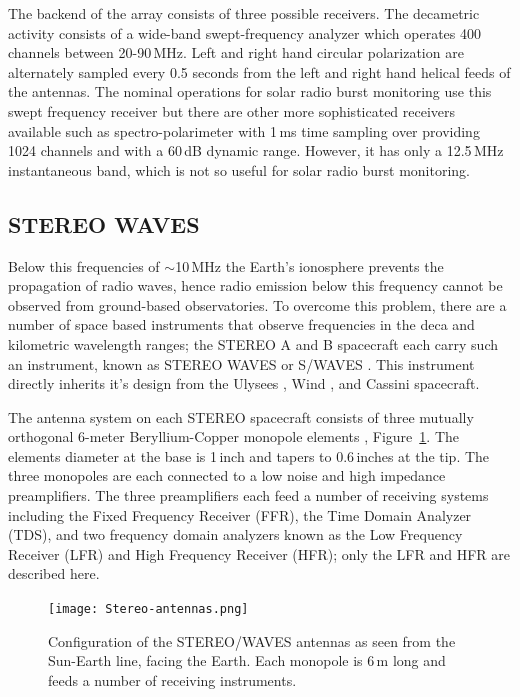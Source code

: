 The backend of the array consists of three possible receivers. The decametric activity consists of a wide-band swept-frequency analyzer which operates 400 channels between 20-90\,MHz. Left and right hand circular polarization are alternately sampled every 0.5 seconds from the left and right hand helical feeds of the antennas. The nominal operations for solar radio burst monitoring use this swept frequency receiver but there are other more sophisticated receivers available such as spectro-polarimeter with 1\,ms time sampling over providing 1024 channels and with a 60\,dB dynamic range. However, it has only a 12.5\,MHz instantaneous band, which is not so useful for solar radio burst monitoring.

\subsection{STEREO WAVES}\label{sec:31}

Below this frequencies of $\sim$10\,MHz the Earth's ionosphere prevents the propagation of radio waves, hence radio emission below this frequency cannot be observed from ground-based observatories. To overcome this problem, there are a number of space based instruments that observe frequencies in the deca and kilometric wavelength ranges; the STEREO A and B spacecraft each carry such an instrument, known as STEREO WAVES or S/WAVES \citep{bougeret2008}. This instrument directly inherits it's design from the Ulysees \citep{stone1992}, Wind \citep{bougeret1995}, and Cassini \citep{gurnett2004} spacecraft.

The antenna system on each STEREO spacecraft consists of three mutually orthogonal 6-meter Beryllium-Copper monopole elements \citep{bale2008}, Figure~\ref{fig:swaves_antennas}. The elements diameter at the base is 1\,inch and tapers to 0.6\,inches at the tip. The three monopoles are each connected to a low noise and high impedance preamplifiers. The three preamplifiers each feed a number of receiving systems including the Fixed Frequency Receiver (FFR), the Time Domain Analyzer (TDS), and two frequency domain analyzers known as the Low Frequency Receiver (LFR) and High Frequency Receiver (HFR); only the LFR and HFR are described here.
\begin{figure}[!t]
\begin{center}
\texttt{[image: Stereo-antennas.png]}
\caption[The SWAVES antennas]{Configuration of the STEREO/WAVES antennas as seen from the Sun-Earth line, facing the Earth. Each monopole is 6\,m long and feeds a number of receiving instruments.}
\label{fig:swaves_antennas}
\end{center}
\end{figure}

